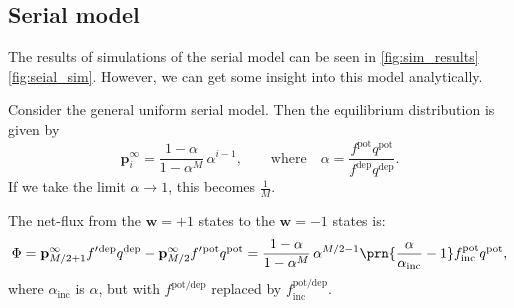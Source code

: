 \documentclass[10pt]{article}
\newcommand{\pr}{\mathbf{p}}
\newcommand{\eq}{\pr^\infty}
\newcommand{\w}{\mathbf{w}}
\newcommand{\pot}{^{\text{pot}}}
\newcommand{\dep}{^{\text{dep}}}
\newcommand{\potdep}{^{\text{pot/dep}}}
\newcommand{\inc}{_{\text{inc}}}
\begin{document}
%
%
%






\subsection{Serial model}\label{sec:multistate}

%
%


The results of simulations of the serial model can be seen in
\autoref{fig:sim_results}\ref{fig:seial_sim}.
However, we can get some insight into this model analytically.



Consider the general uniform serial model.
Then the equilibrium distribution is given by
%
\begin{equation}\label{eq:mutltieq}
  \eq_i = \frac{1-\alpha}{1-\alpha^M}\,\alpha^{i-1},
  \qquad \text{where} \quad
  \alpha=\frac{f\pot q\pot}{f\dep q\dep}.
\end{equation}
%
If we take the limit $\alpha\rightarrow1$, this becomes $\frac{1}{M}$.

The net-flux from the $\w=+1$ states to the $\w=-1$ states is:
%
\begin{equation}\label{eq:multiflux}
  \Phi = \eq_{M/2+1}f'{}\dep q\dep - \eq_{M/2}f'{}\pot q\pot = \frac{1-\alpha}{1-\alpha^M} \, \alpha^{M/2-1} \prn{\frac{\alpha}{\alpha\inc} - 1} f\inc\pot  q\pot,
\end{equation}
%
where $\alpha\inc$ is $\alpha$, but with $f\potdep$ replaced by $f\potdep\inc$.
\end{document}
